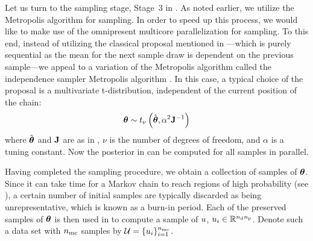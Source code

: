 Let us turn to the sampling stage, Stage~3 in . As noted earlier, we utilize the Metropolis algorithm for sampling. In order to speed up this process, we would like to make use of the omnipresent multicore parallelization for sampling. To this end, instead of utilizing the classical proposal mentioned in ---which is purely sequential as the mean for the next sample draw is dependent on the previous sample---we appeal to a variation of the Metropolis algorithm called the independence sampler Metropolis algorithm \cite{gelman2004}. In this case, a typical choice of the proposal is a multivariate t-distribution, independent of the current position of the chain:
\begin{equation} \elabel{proposal}
  \vparam \sim \studentst{\nu}{\hat{\vparam}}{\alpha^2 \mOI^{-1}}
\end{equation}
where $\hat{{\boldsymbol\theta}}$ and $\mathbf{J}$ are as in , $\nu$ is the number of degrees of freedom, and $\alpha$ is a tuning constant. Now the posterior in  can be computed for all samples in parallel.

Having completed the sampling procedure, we obtain a collection of samples of ${\boldsymbol\theta}$. Since it can take time for a Markov chain to reach regions of high probability (see ), a certain number of initial samples are typically discarded as being unrepresentative, which is known as a burn-in period.
Each of the preserved samples of ${\boldsymbol\theta}$ is then used in  to compute a sample of $u$, $u_i \in \mathbb{R}^{{n_\text{d}} {n_\text{p}}}$.
Denote such a data set with ${n_\text{mc}}$ samples by $\mathcal{U} = \{ u_i \}_{i = 1}^{n_\text{mc}}$.

